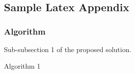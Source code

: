 \documentclass{mscreport}
\begin{document}
\newpage

\begin{appendices}
\section{Sample Latex Appendix}

\subsubsection{Algorithm}

Sub-subsection 1 of the proposed solution.

\begin{algorithm}
\caption{Algorithm 1}\label{euclid}
\begin{algorithmic}
\Else {}
\EndIf   
\end{algorithmic}
\end{algorithm}

\end{appendices}
\end{document}
